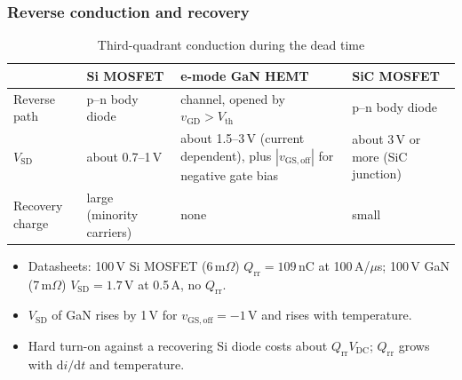 \begin{frame}
	\frametitle{Reverse conduction and recovery}
	\begin{table}
		\centering
		\footnotesize
		\begin{tabular}{|l|>{\raggedright\arraybackslash}p{3.4cm}|>{\raggedright\arraybackslash}p{4.0cm}|>{\raggedright\arraybackslash}p{3.2cm}|}
			\hline
			                   & \textbf{Si MOSFET}             & \textbf{e-mode GaN HEMT}                                          & \textbf{SiC MOSFET}          \\
			\hline
			Reverse path       & p--n body diode                & channel, opened by $v_\mathrm{GD}>V_\mathrm{th}$                  & p--n body diode              \\
			$V_\mathrm{SD}$    & about 0.7--1\,V                & about 1.5--3\,V (current dependent), plus $|v_\mathrm{GS,off}|$ for negative gate bias & about 3\,V or more (SiC junction) \\
			Recovery charge    & large (minority carriers)      & none                                                              & small                        \\
			\hline
		\end{tabular}
		\caption{Third-quadrant conduction during the dead time}
	\end{table}
	\begin{itemize}
		\item Datasheets: 100\,V Si MOSFET (6\,m$\Omega$) $Q_\mathrm{rr}=109$\,nC at 100\,A/$\mu$s; 100\,V GaN (7\,m$\Omega$) $V_\mathrm{SD}=1.7$\,V at 0.5\,A, no $Q_\mathrm{rr}$.
		\item $V_\mathrm{SD}$ of GaN rises by 1\,V for $v_\mathrm{GS,off}=-1$\,V and rises with temperature.
		\item Hard turn-on against a recovering Si diode costs about $Q_\mathrm{rr}V_\mathrm{DC}$; $Q_\mathrm{rr}$ grows with $\mathrm{d}i/\mathrm{d}t$ and temperature.
	\end{itemize}
\end{frame}

